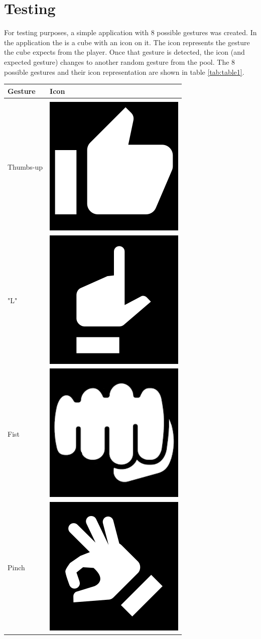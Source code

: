 \documentclass[chi_draft]{sigchi}
\begin{document}
\section{Testing}

For testing purposes, a simple application with 8 possible gestures was created. In the application the is a cube with an icon on it. The icon represents the gesture the cube expects from the player. Once that gesture is detected, the icon (and expected gesture) changes to another random gesture from the pool. The 8 possible gestures and their icon representation are shown in table \ref{tab:table1}.

\begin{table}[h]
  \centering
  \begin{tabular}{ m{5em} m{5em} }
    Gesture & Icon \\
    \hline
    \\
    Thumbs-up & \includegraphics[width=0.2\columnwidth]{figures/thumbs-up.png} \\
    "L" & \includegraphics[width=0.2\columnwidth]{figures/thumb-index-extended.png} \\
    Fist & \includegraphics[width=0.2\columnwidth]{figures/fist.png} \\
    Pinch & \includegraphics[width=0.2\columnwidth]{figures/pinch.png} \\ 

\end{tabular}
\end{table}
\end{document}
